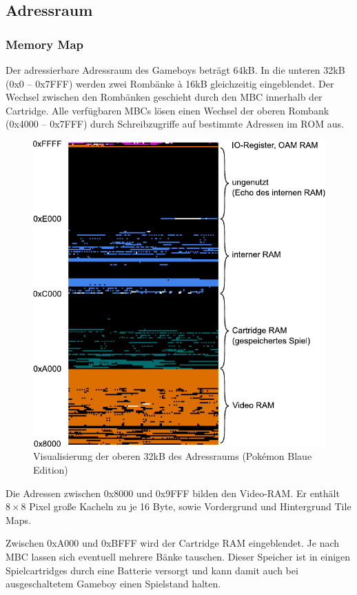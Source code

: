 \documentclass[a4paper]{scrartcl}
\begin{document}
\subsection{Adressraum}

\subsubsection{Memory Map}

Der adressierbare Adressraum des Gameboys beträgt 64kB. In die unteren 32kB (0x0 -- 0x7FFF) werden zwei Rombänke à 16kB gleichzeitig eingeblendet. Der Wechsel zwischen den Rombänken geschieht durch den MBC innerhalb der Cartridge. Alle verfügbaren MBCs lösen einen Wechsel der oberen Rombank (0x4000 -- 0x7FFF) durch Schreibzugriffe auf bestimmte Adressen im ROM aus.

\begin{figure}[H]
\centering
\includegraphics[width=0.75\linewidth]{img/mmap.pdf}
\caption{Visualisierung der oberen 32kB des Adressraums (Pokémon Blaue Edition)}
\label{img:sound}
\end{figure}

Die Adressen zwischen 0x8000 und 0x9FFF bilden den Video-RAM. Er enthält $8 \times 8$ Pixel große Kacheln zu je 16 Byte, sowie Vordergrund und Hintergrund Tile Maps.

Zwischen 0xA000 und 0xBFFF wird der Cartridge RAM eingeblendet. Je nach MBC lassen sich eventuell mehrere Bänke tauschen. Dieser Speicher ist in einigen Spielcartridges durch eine Batterie versorgt und kann damit auch bei ausgeschaltetem Gameboy einen Spielstand halten.
\end{document}
